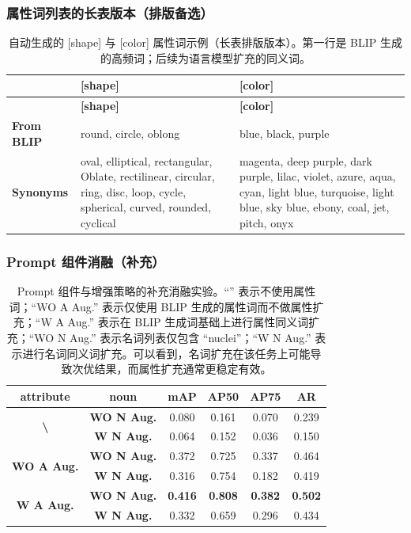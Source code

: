 \subsubsection{属性词列表的长表版本（排版备选）}
\begin{center}
\small
\begin{longtable}{p{3cm}|p{6cm}|p{6cm}}
\caption{自动生成的 [shape] 与 [color] 属性词示例（长表排版版本）。第一行是 BLIP 生成的高频词；后续为语言模型扩充的同义词。}\label{tab:zeroshot_words_long}\\
\hline
\textbf{} & \textbf{[shape]} & \textbf{[color]} \\ \hline
\endfirsthead
\hline
\textbf{} & \textbf{[shape]} & \textbf{[color]} \\ \hline
\endhead
\textbf{From BLIP} & round, circle, oblong & blue, black, purple \\ \hline
\textbf{Synonyms} & oval, elliptical, rectangular, Oblate, rectilinear, circular, ring, disc, loop, cycle, spherical, curved, rounded, cyclical & magenta, deep purple, dark purple, lilac, violet, azure, aqua, cyan, light blue, turquoise, light blue, sky blue, ebony, coal, jet, pitch, onyx \\ \hline
\end{longtable}
\normalsize
\end{center}

\subsubsection{Prompt 组件消融（补充）}
\begin{table}[htbp]
  \centering
  \renewcommand{\arraystretch}{1.1}
  \caption{Prompt 组件与增强策略的补充消融实验。``'' 表示不使用属性词；``WO A Aug.'' 表示仅使用 BLIP 生成的属性词而不做属性扩充；``W A Aug.'' 表示在 BLIP 生成词基础上进行属性同义词扩充；``WO N Aug.'' 表示名词列表仅包含 ``nuclei''；``W N Aug.'' 表示进行名词同义词扩充。可以看到，名词扩充在该任务上可能导致次优结果，而属性扩充通常更稳定有效。}
  \label{tab:zeroshot_prompt_components}
  \begin{tabular}{c|c|cccc}
    \hline
    \textbf{attribute} & \textbf{noun} & \textbf{mAP} & \textbf{AP50} & \textbf{AP75} & \textbf{AR} \\ \hline
    \multirow{2}{*}{\textbf{\textbackslash}} & \textbf{WO N Aug.} & 0.080 & 0.161 & 0.070 & 0.239 \\
     & \textbf{W N Aug.}  & 0.064 & 0.152 & 0.036 & 0.150 \\ \hline
    \multirow{2}{*}{\textbf{WO A Aug.}} & \textbf{WO N Aug.} & 0.372 & 0.725 & 0.337 & 0.464 \\
     & \textbf{W N Aug.}  & 0.316 & 0.754 & 0.182 & 0.419 \\ \hline
    \multirow{2}{*}{\textbf{W A Aug.}} & \textbf{WO N Aug.} & \textbf{0.416} & \textbf{0.808} & \textbf{0.382} & \textbf{0.502} \\
     & \textbf{W N Aug.}  & 0.332 & 0.659 & 0.296 & 0.434 \\ \hline
  \end{tabular}
\end{table}

